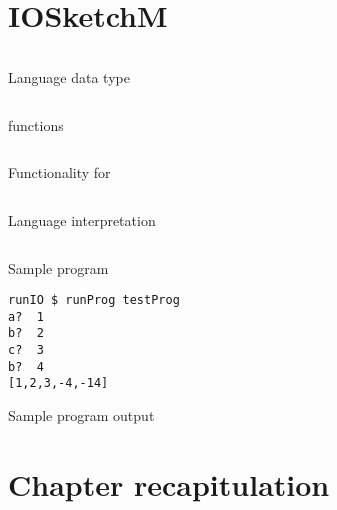 \documentclass[thesis-solanki.tex]{subfiles}
\begin{document}
\section{IOSketchM}

\begin{code-list}[H]
\begin{singlespace}
\inputminted[linenos, firstline=31, lastline=58]{haskell}{IOSketchM.hs}
\end{singlespace}
\caption{Language data type}
\label{tab:iosketchmlanguagedatatype}
\end{code-list}

\begin{code-list}[H]
\begin{singlespace}
\inputminted[linenos, firstline=74, lastline=111]{haskell}{IOSketchM.hs}
\end{singlespace}
\caption{ functions}
\label{tab:iosketchmrunfunctions}
\end{code-list}


\begin{code-list}[H]
\begin{singlespace}
\inputminted[linenos, firstline=130, lastline=152]{haskell}{IOSketchM.hs}
\end{singlespace}
\caption{Functionality for }
\label{tab:iosketchmxmmonadfunctionality}
\end{code-list}

\begin{code-list}[H]
\begin{singlespace}
\inputminted[linenos, firstline=161, lastline=184]{haskell}{IOSketchM.hs}
\end{singlespace}
\caption{Language interpretation}
\label{tab:iosketchmlanguageinterpretation}
\end{code-list}


\begin{code-list}[H]
\begin{singlespace}
\inputminted[linenos, firstline=201, lastline=228]{haskell}{IOSketchM.hs}
\end{singlespace}
\caption{Sample program}
\label{tab:iosketchmsampleprogram}
\end{code-list}

\begin{code-list}[H]
\begin{singlespace}
\begin{verbatim}
runIO $ runProg testProg 
a?  1
b?  2
c?  3
b?  4
[1,2,3,-4,-14]
\end{verbatim}
\end{singlespace}
\caption{Sample program output}
\label{tab:iosketchmsampleprogramoutput}
\end{code-list}


\section{Chapter recapitulation}

\ifMain
\begin{scope}
  \nolinenumbers
  \enotesize
  \par
  \begin{singlespace}
  \setlength{\parskip}{12pt plus 2pt minus 1pt}
  \theendnotes
  \par
  \end{singlespace}
\end{scope}
\fi
\end{document}
